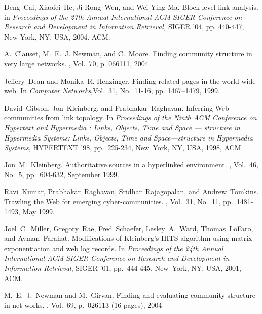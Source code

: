 \documentclass [a4j,11pt] {jsarticle}
\begin{document}
\begin{thebibliography}{10}

Deng~Cai, Xiaofei~He, Ji-Rong~Wen, and Wei-Ying Ma.
\newblock Block-level link analysis.
\newblock in {\em Proceedings of the 27th Annual International ACM SIGER Conference on Research and Development in Infornation Retrieval,}
\newblock SIGER '04, pp. 440-447, New York, NY, USA, 2004. ACM.

A.~Clauset, M.~E.~J. Newman, and C.~Moore.
\newblock Finding community structure in very large networks.
, Vol.~70, p. 066111, 2004.

Jeffery~Dean and Monika~R. Henzinger.
\newblock Finding related pages in the world wide web.
\newblock In {\em Computer Networks},Vol.~31, No.~11-16, pp. 1467--1479, 1999.

David~Gibson, Jon~Kleinberg, and Prabhakar~Raghavan.
\newblock Inferring Web communities from link topology.
\newblock In {\em Proceedings of the Ninth ACM Conference on Hypertext and Hypermedia : Links, Objects, Time and Space — structure in Hypermedia Systems: Links, Objects, Time and Space—structure in Hypermedia Systems},
\newblock HYPERTEXT '98, pp.~225-234, New~York, NY, USA, 1998, ACM.

Jon~M.~Kleinberg.
\newblock Authoritative sources in a hyperlinked environment.
, Vol.~46, No.~5, pp.~604-632, September 1999.

Ravi~Kumar, Prabhakar~Raghavan, Sridhar~Rajagopalan, and Andrew~Tomkins.
\newblock Trawling the Web for emerging cyber-communities.
, Vol.~31, No.~11, pp.~1481-1493, May 1999.

Joel~C.~Miller, Gregory~Rae, Fred~Schaefer, Lesley~A.~Ward, Thomas~LoFaro, and Ayman~Farahat.
\newblock Modifications of Kleinberg's HITS algorithm using matrix exponentiation and web log records.
\newblock In {\em Proceedings of the 24th Annual International ACM SIGER Conference on Research and Development in Information Retrieval},
\newblock SIGER '01, pp.~444-445, New~York, NY, USA, 2001, ACM.

M.~E.~J.~Newman and M.~Girvan.
\newblock Finding and evaluating community structure in net-works.
, Vol.~69, p.~026113 (16 pages), 2004


\end{thebibliography}
\end{document}
